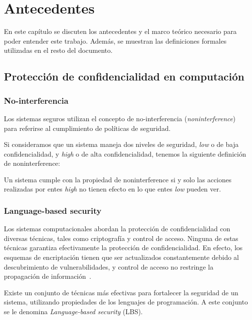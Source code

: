 \chapter{Antecedentes}

En este capítulo se discuten los antecedentes y el marco teórico necesario para poder entender este trabajo. Además, se muestran las definiciones formales utilizadas en el resto del documento.

\section{Protección de confidencialidad en computación}

\subsection{No-interferencia}
Los sistemas seguros utilizan el concepto de no-interferencia (\textit{noninterference})~\cite{noninterference} para referirse al cumplimiento de políticas de seguridad.

Si consideramos que un sistema maneja dos niveles de seguridad, \textit{low} o de baja confidencialidad, y \textit{high} o de alta confidencialidad, tenemos la siguiente definición de noninterference:

\begin{defn}[Noninterference]
  Un sistema cumple con la propiedad de noninterference si y solo las acciones realizadas por entes \textit{high} no tienen efecto en lo que entes \textit{low} pueden ver.
\end{defn}

\subsection{Language-based security}
Los sistemas computacionales abordan la protección de confidencialidad con diversas técnicas, tales como criptografía y control de acceso. Ninguna de estas técnicas garantiza efectivamente la protección de confidencialidad. En efecto, los esquemas de encriptación tienen que ser actualizados constantemente debido al descubrimiento de vulnerabilidades, y control de acceso no restringe la propagación de información~\cite{myers-phd}.

Existe un conjunto de técnicas más efectivas para fortalecer la seguridad de un sistema, utilizando propiedades de los lenguajes de programación. A este conjunto se le denomina \textit{Language-based security} (LBS).

